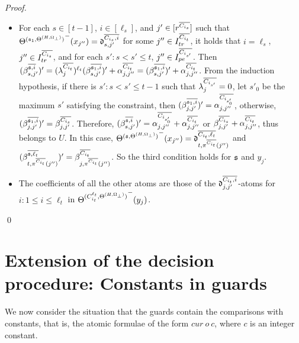 \begin{appendix}
\begin{proof}
\begin{itemize}
	\item For each $s \in [t-1]$, $i \in [\ell_s]$, and $j' \in [r^{\overline{C_{i_s}}}]$ such that ${\Theta^{({\mathfrak{s} }_1,\Theta^{(H,\Omega_\bot)})}}^-(x_{j''}) = \mathfrak{d}^{\overline{C_{i_s}, i}}_{s, j'}$ for some $j'' \in I^{\overline{C_{i_t}}}_{tr}$, it holds that $i = \ell_s$, $j'' \in I^{\overline{C_{i_s}}}_{tr}$, and for each $s': s < s' \le t$, $j'' \in I^{\overline{C_{i_{s'}}}}_{pe}$. Then $(\beta^{\overline{{\mathfrak{s} },i}}_{s,j'})' =(\lambda^{\overline{C_{i_t}}}_{j})^{\ell_t}  (\beta^{\overline{{\mathfrak{s} }_1, i}}_{s, j'})' + \alpha^{\overline{C_{i_t}}}_{j, j''}  =  (\beta^{\overline{{\mathfrak{s} }_1, i}}_{s, j'})' + \alpha^{\overline{C_{i_t}}}_{j, j''}$. From the induction hypothesis,  if there is $s': s < s' \le t-1$ such that $\lambda^{\overline{C_{i_{s'}}}}_j =0$, let $s'_0$ be the maximum $s'$ satisfying the constraint, then $(\beta^{\overline{{\mathfrak{s} }_1, i}}_{j,j'})'=\alpha^{\overline{C_{i_{s'_0}}}}_{j, j''}$, otherwise, $(\beta^{\overline{{\mathfrak{s} }_1, i}}_{j,j'})'= \beta^{\overline{C_{i_s}}}_{j,j'}$. Therefore, $(\beta^{\overline{{\mathfrak{s} },i}}_{s,j'})' = \alpha^{\overline{C_{i_{s'_0}}}}_{j, j''} + \alpha^{\overline{C_{i_t}}}_{j, j''}$ or $\beta^{\overline{C_{i_s}}}_{j,j'} + \alpha^{\overline{C_{i_t}}}_{j, j''}$, thus belongs to $U$. In this case, ${\Theta^{({\mathfrak{s} },\Theta^{(H,\Omega_\bot)})}}^-(x_{j''})=\mathfrak{d}^{\overline{C_{i_t},\ell_t}}_{t, \pi^{\overline{C_{i_t}}}(j'')}$ and $(\beta^{\overline{{\mathfrak{s} },\ell_t}}_{t, \pi^{\overline{C_{i_t}}}(j'')})' = \beta^{\overline{C_{i_t}}}_{j, \pi^{\overline{C_{i_t}}}(j'')}$. So the third condition holds for ${\mathfrak{s} }$ and $y_j$.
	\item The coefficients of all the other atoms are those of  the $\mathfrak{d}^{\overline{C_{i_t}, i}}_{j, j'}$-atoms for $i: 1 \le i \le \ell_t$ in ${\Theta^{(C^{\ell_t}_{i_t},\Theta^{(H,\Omega_\bot)})}}^-(y_j)$.
\end{itemize} \qed

\end{proof}


\section{Extension of the decision procedure: Constants in guards}

We now consider the situation that the guards contain the comparisons with constants, that is, the atomic formulae of the form $cur\ o\ c$, where $c$ is an integer constant. 


\end{appendix}
